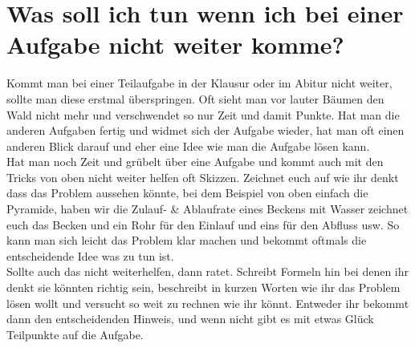 	
	\section{Was soll ich tun wenn ich bei einer Aufgabe nicht weiter komme?}
		Kommt man bei einer Teilaufgabe in der Klausur oder im Abitur nicht weiter,
		sollte man diese erstmal überspringen. Oft sieht man vor lauter Bäumen den
		Wald nicht mehr und verschwendet so nur Zeit und damit Punkte. Hat man die
		anderen Aufgaben fertig und widmet sich der Aufgabe wieder, hat man oft einen
		anderen Blick darauf und eher eine Idee wie man die Aufgabe lösen kann.\\
		Hat man noch Zeit und grübelt über eine Aufgabe und kommt auch mit den Tricks
		von oben nicht weiter helfen oft Skizzen. Zeichnet euch auf wie ihr denkt dass
		das Problem aussehen könnte, bei dem Beispiel von oben einfach die Pyramide,
		haben wir die Zulauf- \& Ablaufrate eines Beckens mit Wasser zeichnet euch das
		Becken und ein Rohr für den Einlauf und eins für den Abfluss usw. So kann man
		sich leicht das Problem klar machen und bekommt oftmals die entscheidende Idee
		was zu tun ist.\\
		Sollte auch das nicht weiterhelfen, dann ratet. Schreibt Formeln hin bei denen
		ihr denkt sie könnten richtig sein, beschreibt in kurzen Worten wie ihr das
		Problem lösen wollt und versucht so weit zu rechnen wie ihr könnt. Entweder
		ihr bekommt dann den entscheidenden Hinweis, und wenn nicht gibt es mit etwas
		Glück Teilpunkte auf die Aufgabe.
